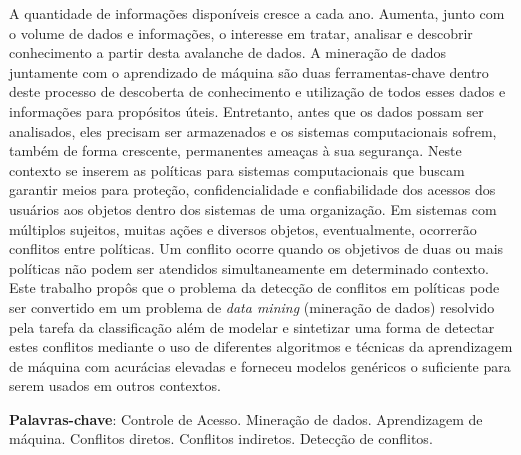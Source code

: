 \documentclass[
	12pt,				%
	openright,			%
	oneside,			%
	a4paper,			%
	english,			%
	french,				%
	spanish,			%
	brazil				%
	]{abntex2}
\begin{document}

\setlength{\absparsep}{18pt} %
\begin{resumo}
A quantidade de informações disponíveis cresce a cada ano. Aumenta, junto com o volume de dados e informações, o interesse em tratar, analisar e descobrir conhecimento a partir desta avalanche de dados. A mineração de dados juntamente com o aprendizado de máquina são duas ferramentas-chave dentro deste processo de descoberta de conhecimento e utilização de todos esses dados e informações para propósitos úteis. Entretanto, antes que os dados possam ser analisados, eles precisam ser armazenados e os sistemas computacionais sofrem, também de forma crescente, permanentes ameaças à sua segurança. Neste contexto se inserem as políticas para sistemas computacionais que buscam garantir meios para proteção, confidencialidade e confiabilidade dos acessos dos usuários aos objetos dentro dos sistemas de uma organização. Em sistemas com múltiplos sujeitos, muitas ações e diversos objetos, eventualmente, ocorrerão conflitos entre políticas. Um conflito ocorre quando os objetivos de duas ou mais políticas não podem ser atendidos simultaneamente em determinado contexto. Este trabalho propôs que o problema da detecção de conflitos em políticas pode ser convertido em um problema de \textit{data mining} (mineração de dados) resolvido pela tarefa da classificação além de modelar e sintetizar uma forma de detectar estes conflitos mediante o uso de diferentes algoritmos e técnicas da aprendizagem de máquina com acurácias elevadas e forneceu modelos genéricos o suficiente para serem usados em outros contextos.

 \textbf{Palavras-chave}: Controle de Acesso. Mineração de dados. Aprendizagem de máquina. Conflitos diretos. Conflitos indiretos. Detecção de conflitos.
\end{resumo}
\end{document}
